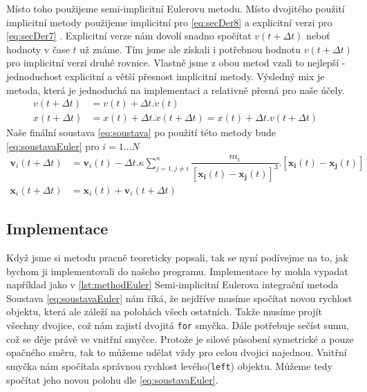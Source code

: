 Místo toho použijeme semi-implicitní Eulerovu metodu. Místo dvojitého použití implicitní metody použijeme implicitní pro \eqref{eq:secDer8} a explicitní verzi pro \eqref{eq:secDer7} . Explicitní verze nám dovolí snadno spočítat $ v(t + \Delta t) $ neboť hodnoty v čase $ t $ už známe. Tím jsme ale získali i potřebnou hodnotu $ v(t + \Delta t) $ pro implicitní verzi druhé rovnice. Vlastně jsme z obou metod vzali to nejlepší - jednoduchost explicitní a větší přesnost implicitní metody. Výsledný mix je metoda, která je jednoduchá na implementaci a relativně přesná pro naše účely.
\begin{align}
\label{eq:secDer7}
v(t + \Delta t)&=v(t) + \Delta t . \dot{v}(t)\\
\label{eq:secDer8}
x(t+\Delta t) &= x(t) + \Delta t. \dot{x}(t + \Delta t) = x(t) + \Delta t.v(t + \Delta t)\quad
\end{align}
Naše finální soustava \eqref{eq:soustava} po použití této metody bude \eqref{eq:soustavaEuler} pro $ i=1 \dots N $
\begin{subequations}\label{eq:soustavaEuler}
\begin{align}
\boldsymbol {v}_i(t+\Delta t) &=\boldsymbol{{v}}_i(t)  - \Delta t . \kappa \sum_{j=1,j \neq i}^{n}\dfrac{m_i}
{\left[ \boldsymbol{x_i}(t) - \boldsymbol{x_j}(t)\right] ^3} . 
\left[ \boldsymbol{x_i}(t) - \boldsymbol{x_j}(t)\right] \\
\boldsymbol {x}_i(t+\Delta t)& =\boldsymbol{{x}}_i(t)  +\boldsymbol {v}_i(t+\Delta t)
\end{align}
\end{subequations}
\subsection{Implementace}
Když jsme si metodu pracně teoreticky popsali, tak se nyní podívejme na to, jak bychom ji implementovali do našeho programu. Implementace by mohla vypadat například jako v \ref{lst:methodEuler}
{Semi-implicitní Eulerova integrační metoda}
Soustava \eqref{eq:soustavaEuler} nám říká, že nejdříve musíme spočítat novou rychlost objektu, která ale záleží na polohách všech ostatních. Takže musíme projít všechny dvojice, což nám zajistí dvojitá \texttt{for} smyčka. Dále potřebuje sečíst sumu, což se děje právě ve vnitřní smyčce. Protože je silové působení symetrické a pouze opačného směru, tak to můžeme udělat vždy pro celou dvojici najednou.
Vnitřní smyčka nám spočítala správnou rychlost levého(\texttt{left}) objektu.
Můžeme tedy spočítat jeho novou polohu dle \eqref{eq:soustavaEuler}.

